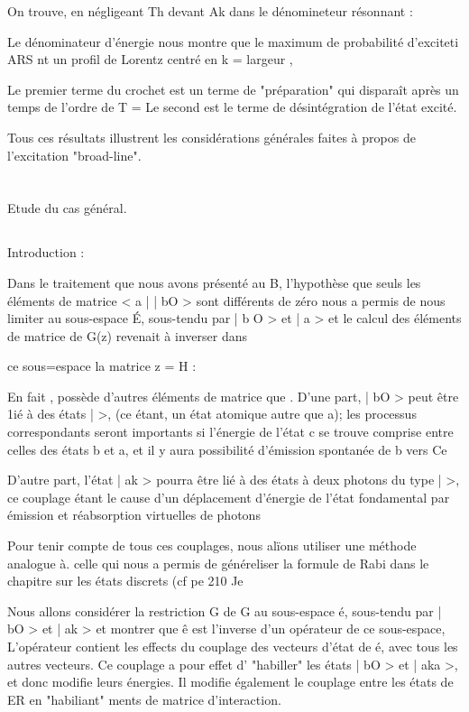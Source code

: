 On trouve, en négligeant Th devant Ak dans le dénomineteur résonnant :


Le dénominateur d'énergie nous montre que le maximum de probabilité d'exciteti ARS nt un profil de Lorentz centré en k = 
largeur ,

Le premier terme du crochet est un terme de "préparation" qui
disparaît après un temps de l'ordre de T =  Le second est le terme de
désintégration de l'état excité.

Tous ces résultats illustrent les considérations générales faites à propos de l'excitation "broad-line".

\section{} Etude du cas général.%
\subsection{} Introduction :%

Dans le traitement que nous avons présenté au  B, l'hypothèse
que seuls les éléments de matrice < a | | bO > sont différents de zéro
nous a permis de nous limiter au sous-espace É, sous-tendu par | b O > et
| a > et le calcul des éléments de matrice de G(z) revenait à inverser dans

ce sous=espace la matrice z = H :

En fait , possède d'autres éléments de matrice que
.
D'une part, | bO > peut être 1ié à des états |  >, (ce étant,
un état atomique autre que a); les processus correspondants seront importants
si l'énergie de l'état c se trouve comprise entre celles des états b et a, et
il y aura possibilité d'émission spontanée de b vers Ce

D'autre part, l'état | ak > pourra être lié à des états à deux
photons du type |  >, ce couplage étant le cause d'un déplacement
d'énergie de l'état fondamental par émission et réabsorption virtuelles de
photons

Pour tenir compte de tous ces couplages, nous alïons utiliser
une méthode analogue à. celle qui nous a permis de généreliser la formule de
Rabi dans le chapitre sur les états discrets (cf pe 210 Je

Nous allons considérer la restriction G de G au sous-espace é,
sous-tendu par | bO > et | ak > et montrer que ê est l'inverse d'un opérateur
de ce sous-espace,  L'opérateur  contient les effects du couplage
des vecteurs d'état de é, avec tous les autres vecteurs. Ce couplage a pour
effet d' "habiller" les états | bO > et | aka >, et donc modifie leurs énergies.
Il modifie également le couplage entre les états de ER en "habiliant" 
ments de matrice d'interaction.

